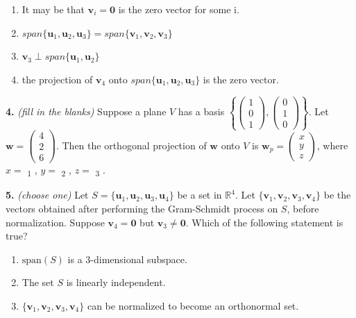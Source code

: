 \documentclass[10pt,a4paper]{article}
\begin{document}
\begin{enumerate}[label=(\Alph*)]
\item It may be that \(\mathbf{v}_i=\mathbf{0}\) is the zero vector for some i.
\item \(span\{\mathbf{u}_1,\mathbf{u}_2,\mathbf{u}_3\}=span\{\mathbf{v}_1,\mathbf{v}_2,\mathbf{v}_3\}\)
\item \(\mathbf{v}_3\perp span\{\mathbf{u}_1,\mathbf{u}_2\}\)
\item the projection of \(\mathbf{v}_4\) onto \(span\{\mathbf{u}_1,\mathbf{u}_2,\mathbf{u}_3\}\) is the zero vector.
\end{enumerate}
\smallskip
\textbf{4.} \textit{(fill in the blanks)} Suppose a plane \(V\) has a basis \(\left\{\begin{pmatrix}1\\0\\1\end{pmatrix},\begin{pmatrix}0\\1\\0\end{pmatrix}\right\}\). Let \(\mathbf{w}=\begin{pmatrix}4\\2\\6\end{pmatrix}\). Then the orthogonal projection of \(\mathbf{w}\) onto \(V\) is \(\mathbf{w}_p=\begin{pmatrix}x\\y\\z\end{pmatrix}\), where \(x=\) \underline{\hspace{1.2cm}}\textsubscript{1} 
, \(y=\) \underline{\hspace{1.2cm}}\textsubscript{2} 
, \(z=\) \underline{\hspace{1.2cm}}\textsubscript{3} 
.

\smallskip
\textbf{5.} \textit{(choose one)} Let \(S=\{\mathbf{u}_1,\mathbf{u}_2,\mathbf{u}_3,\mathbf{u}_4\}\) be a set in \(\mathbb{R}^4\). Let \(\{\mathbf{v}_1,\mathbf{v}_2,\mathbf{v}_3,\mathbf{v}_4\}\) be the vectors obtained after performing the Gram-Schmidt process on \(S\), before normalization. Suppose \(\mathbf{v}_4=\mathbf{0}\) but \(\mathbf{v}_3\neq\mathbf{0}\). Which of the following statement is true?

\begin{enumerate}[label=(\Alph*)]
\item \(\text{span}(S)\) is a 3-dimensional subspace.
\item The set \(S\) is linearly independent.
\item \(\{\mathbf{v}_1,\mathbf{v}_2,\mathbf{v}_3,\mathbf{v}_4\}\) can be normalized to become an orthonormal set.
\end{enumerate}
\smallskip
\end{document}
